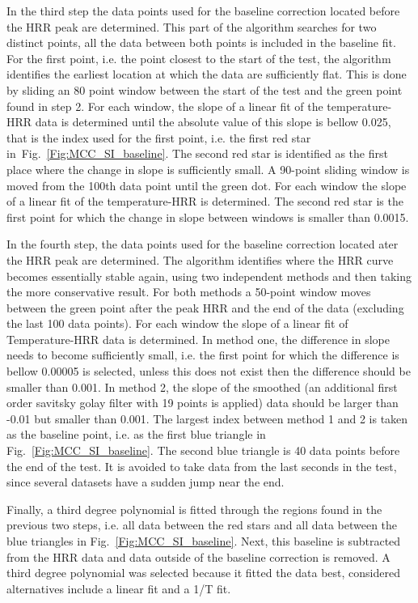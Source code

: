 In the third step the data points used for the baseline correction located before the HRR peak are determined. This part of the algorithm searches for two distinct points, all the data between both points is included in the baseline fit. For the first point, i.e. the point closest to the start of the test, the algorithm identifies the earliest location at which the data are sufficiently flat. This is done by sliding an 80 point window between the start of the test and the green point found in step 2. For each window, the slope of a linear fit of the temperature-HRR data is determined until the absolute value of this slope is bellow 0.025, that is the index used for the first point, i.e. the first red star in~Fig.~\ref{Fig:MCC_SI_baseline}. The second red star is identified as the first place where the change in slope is sufficiently small. A 90-point sliding window is moved from the 100th data point until the green dot. For each window the slope of a linear fit of the temperature-HRR is determined. The second red star is the first point for which the change in slope between windows is smaller than 0.0015.


In the fourth step, the data points used for the baseline correction located ater the HRR peak are determined. The algorithm identifies where the HRR curve becomes essentially stable again, using two independent methods and then taking the more conservative result. For both methods a 50-point window moves between the green point after the peak HRR and the end of the data (excluding the last 100 data points). For each window the slope of a linear fit of Temperature-HRR data is determined. In method one, the difference in slope needs to become sufficiently small, i.e. the first point for which the difference is bellow 0.00005 is selected, unless this does not exist then the difference should be smaller than 0.001. In method 2, the slope of the smoothed (an additional first order savitsky golay filter with 19 points is applied)  data should be larger than -0.01 but smaller than 0.001. The largest index between method 1 and 2 is taken as the baseline point, i.e. as the first blue triangle in Fig.~\ref{Fig:MCC_SI_baseline}. The second blue triangle is 40 data points before the end of the test. It is avoided to take data from the last seconds in the test, since several datasets have a sudden jump near the end.


Finally, a third degree polynomial is fitted through the regions found in the previous two steps, i.e. all data between the red stars and all data between the blue triangles in Fig.~\ref{Fig:MCC_SI_baseline}. Next, this baseline is subtracted from the HRR data and data outside of the baseline correction is removed. A third degree polynomial was selected because it fitted the data best, considered alternatives include a linear fit and a 1/T fit.

